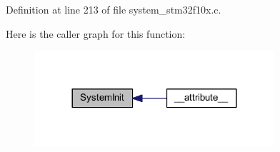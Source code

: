 Definition at line 213 of file system\+\_\+stm32f10x.\+c.

Here is the caller graph for this function\+:
\nopagebreak
\begin{figure}[H]
\begin{center}
\leavevmode
\includegraphics[width=252pt]{group___s_t_m32_f10x___system___private___functions_ga93f514700ccf00d08dbdcff7f1224eb2_icgraph}
\end{center}
\end{figure}
